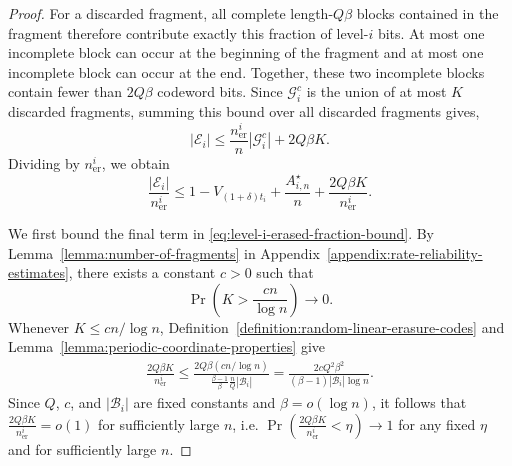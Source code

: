 \documentclass[journal,letterpaper,onecolumn,11pt]{IEEEtran}
\newcommand{\cB}{\mathcal{B}}
\newcommand{\cE}{\mathcal{E}}
\newcommand{\cG}{\mathcal{G}}
\begin{document}
\begin{proof}
For a discarded fragment, all complete length-\(Q\beta\) blocks contained
in the fragment therefore contribute exactly this fraction of level-\(i\)
bits.  At most one incomplete block can occur at the beginning of the
fragment and at most one incomplete block can occur at the end.  Together,
these two incomplete blocks contain fewer than \(2Q\beta\) codeword
bits.  
Since \(\cG_i^c\) is the union of at most \(K\) discarded fragments,
summing this bound over all discarded fragments gives,
\[
|\cE_i|
\leq
\frac{n_{\mathrm{er}}^i}{n}|\cG_i^c|
+
2Q\beta K.
\]
Dividing by \(n_{\mathrm{er}}^i\), we obtain
\begin{equation}
\frac{|\cE_i|}{n_{\mathrm{er}}^i}
\leq
1-V_{(1+\delta)t_i}
+
\frac{A_{i,n}^{\star}}{n}
+
\frac{2Q\beta K}{n_{\mathrm{er}}^i}.
\label{eq:level-i-erased-fraction-bound}
\end{equation}

We first bound the final term in
\eqref{eq:level-i-erased-fraction-bound}.  By
Lemma~\ref{lemma:number-of-fragments} in Appendix~\ref{appendix:rate-reliability-estimates}, there exists a constant \(c>0\)
such that
\[
\Pr\left(
K>\frac{cn}{\log n}
\right)
\longrightarrow0.
\]
Whenever \(K\leq cn/\log n\), Definition~\ref{definition:random-linear-erasure-codes}
and Lemma~\ref{lemma:periodic-coordinate-properties} give
\[
\begin{aligned}
\frac{2Q\beta K}{n_{\mathrm{er}}^i}
\leq
\frac{2Q\beta(cn/\log n)}
{\frac{\beta-1}{\beta}\frac{n}{Q}|\cB_i|}
=
\frac{2cQ^2\beta^2}
{(\beta-1)|\cB_i|\log n}.
\end{aligned}
\]
Since \(Q\), \(c\), and \(|\cB_i|\) are fixed constants and
\(\beta=o(\log n)\), it follows that
$\frac{2Q\beta K}{n_{\mathrm{er}}^i}=o(1)$ for sufficiently large $n$, i.e. $\Pr(\frac{2Q\beta K}{n_{\mathrm{er}}^i}<\eta)\xrightarrow[]{}1$ for any fixed $\eta$ and for sufficiently large $n$.


\end{proof}
\end{document}
